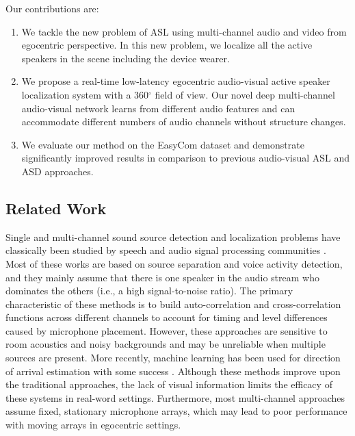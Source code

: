 \documentclass[10pt,twocolumn,letterpaper]{article}
\begin{document}
Our contributions are: 
\begin{enumerate}
	\item We tackle the new problem of ASL using multi-channel audio and video from egocentric perspective. In this new problem, we localize 
	      all the active speakers in the scene including the device wearer. 
	\item We propose a real-time low-latency egocentric audio-visual active speaker localization system with a 360$^{\circ}$ field of view. 
                  Our novel deep multi-channel audio-visual network learns from different audio features 
		  and can accommodate different numbers of audio channels without structure changes.
	\item We evaluate our method on the EasyCom dataset and demonstrate significantly 
	improved results in comparison to previous audio-visual ASL and ASD approaches.  
\end{enumerate}



\subsection{Related Work} \label{sec:related}
Single and multi-channel sound source detection and localization problems have classically been studied 
by speech and audio signal processing communities \cite{audioprocess, doa, soundloc1}. 
Most of these works are based on source separation and voice activity detection, 
and they mainly assume that there is one speaker in the audio stream who dominates the others (i.e., a high signal-to-noise ratio). 
The primary characteristic of these methods is to build auto-correlation and cross-correlation functions across different channels
to account for timing and level differences caused by microphone placement.  
However, these approaches are sensitive to room acoustics and noisy backgrounds and may be unreliable when multiple sources are present. 
More recently, machine learning has been used for direction of arrival estimation with some success \cite{deep-sound-loc1, deep-sound-loc2, deepdoasurvey}. 
Although these methods improve upon the traditional approaches, 
the lack of visual information limits the efficacy of these systems in real-word settings. 
Furthermore, most multi-channel approaches assume fixed, stationary microphone arrays, 
which may lead to poor performance with moving arrays in egocentric settings. 
\end{document}
